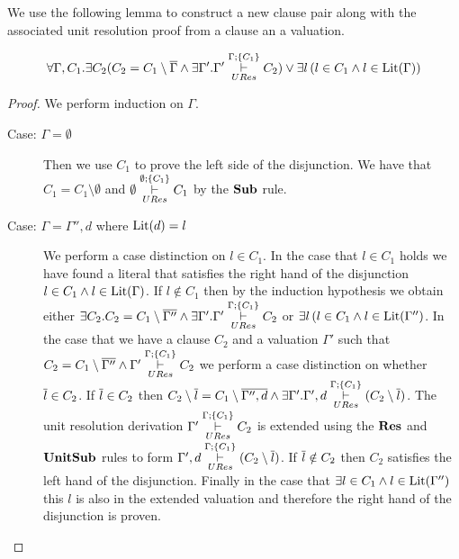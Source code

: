 We use the following lemma to construct a new clause pair along with the associated unit resolution proof from a clause an a valuation. \\
\medskip
\begin{mylemma}\label{lem:compgen1}
\begin{align*}
\forall \Gamma, C_1. \exists C_2( C_2 = C_1 \setminus \mybar{\Gamma} \wedge \exists \Gamma' . \Gamma' \clmodres{\Gamma}{\{C_1 \}} C_2) \vee \exists l\, (l \in C_1 \wedge l \in \lit{\Gamma})
\end{align*}
\begin{proof}
We perform induction on $\Gamma$.
\begin{description}
\item[Case: $\Gamma = \emptyset$] Then we use $C_1$ to prove the left side of the disjunction. We have that $C_1 = C_1 \setminus \emptyset$ and $\emptyset \clmodres{\emptyset}{\{C_1 \}} C_1$ by the $\Sub$ rule.
\item[Case: $\Gamma = \Gamma'', d$ where $\lit{d} = l$]
We perform a case distinction on $l \in C_1$. In the case that $l \in C_1$ holds we have found a literal that satisfies the right hand of the disjunction $l \in C_1 \wedge l \in \lit{\Gamma}$. If $l \notin C_1$ then by the induction hypothesis we obtain either $\exists C_2. C_2 = C_1 \setminus \mybar{\Gamma''} \wedge \exists \Gamma' . \Gamma' \clmodres{\Gamma}{\{C_1 \}} C_2$  or $\exists l\, (l \in C_1 \wedge l \in \lit{\Gamma''}$. In the case that we have a clause $C_2$ and a valuation $\Gamma'$ such that $C_2 = C_1 \setminus \mybar{\Gamma''} \wedge  \Gamma' \clmodres{\Gamma}{\{C_1 \}} C_2$ we perform a case distinction on whether $\mybar{l} \in C_2$. If $\mybar{l} \in C_2$ then $C_2\setminus \mybar{l} = C_1 \setminus \mybar{\Gamma'', d} \wedge \exists \Gamma' . \Gamma',d  \clmodres{\Gamma}{\{C_1 \}} (C_2 \setminus \mybar{l})$. The unit resolution derivation $ \Gamma' \clmodres{\Gamma}{\{C_1 \}} C_2$  is extended using the $\Res$ and $\UnitSub$ rules to form  $\Gamma',d  \clmodres{\Gamma}{\{C_1 \}} (C_2 \setminus \mybar{l}) $. If $\mybar{l} \notin C_2$ then $C_2$ satisfies the left hand of the disjunction. Finally in the case that $\exists l \in C_1 \wedge l \in \lit{\Gamma''}$  this $l$ is also in the extended valuation and therefore the right hand of the disjunction is proven.

\begin{comment}
We perform a case distinction on whether $l \in \lit(\Gamma)$ if it is then we have found a literal  such that $l \in C_1 \wedge l \in \lit(\Gamma)$. If $l \notin \lit{\Gamma}$ by the induction hypothesis we obtain $\exists C_4. C_4 = C_3 \setminus \mybar{\Gamma} \wedge \exists \Gamma'. \, \Gamma'  \clmodres{\Gamma}{\{ C_3 \}} C_4  \vee  \exists l \, (l \in C_3 \wedge l \in \lit{\Gamma})$. Leading to two further cases. In the case that  the left hand of the disjunction holds we then perform a case distinction on whether $\mybar{l} \in \Gamma$
\end{comment}

\end{description}
\end{proof}
\end{mylemma}

